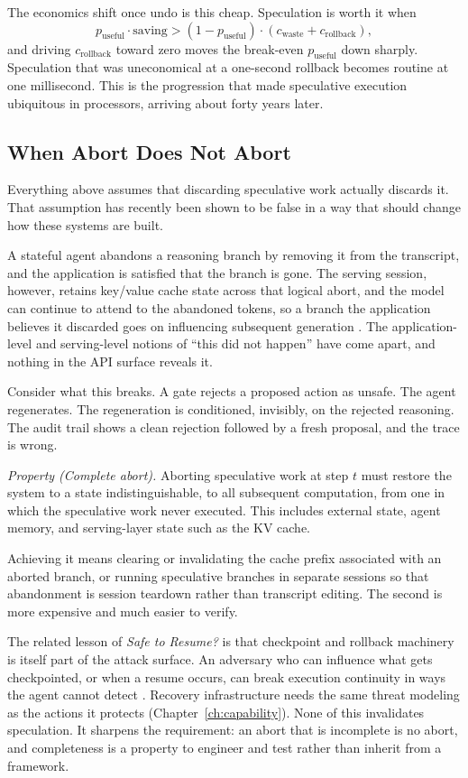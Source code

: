 \documentclass[11pt]{book}
\begin{document}
The economics shift once undo is this cheap. Speculation is worth it when
\[
p_{\text{useful}} \cdot \text{saving} > (1 - p_{\text{useful}}) \cdot (c_{\text{waste}} + c_{\text{rollback}}),
\]
and driving $c_{\text{rollback}}$ toward zero moves the break-even $p_{\text{useful}}$ down sharply. Speculation that was uneconomical at a one-second rollback becomes routine at one millisecond. This is the progression that made speculative execution ubiquitous in processors, arriving about forty years later.

\subsection{When Abort Does Not Abort}

Everything above assumes that discarding speculative work actually discards it. That assumption has recently been shown to be false in a way that should change how these systems are built.

A stateful agent abandons a reasoning branch by removing it from the transcript, and the application is satisfied that the branch is gone. The serving session, however, retains key/value cache state across that logical abort, and the model can continue to attend to the abandoned tokens, so a branch the application believes it discarded goes on influencing subsequent generation \cite{abortedkv2026}. The application-level and serving-level notions of ``this did not happen'' have come apart, and nothing in the API surface reveals it.

Consider what this breaks. A gate rejects a proposed action as unsafe. The agent regenerates. The regeneration is conditioned, invisibly, on the rejected reasoning. The audit trail shows a clean rejection followed by a fresh proposal, and the trace is wrong.

\textit{Property (Complete abort).} Aborting speculative work at step $t$ must restore the system to a state indistinguishable, to all subsequent computation, from one in which the speculative work never executed. This includes external state, agent memory, and serving-layer state such as the KV cache.

Achieving it means clearing or invalidating the cache prefix associated with an aborted branch, or running speculative branches in separate sessions so that abandonment is session teardown rather than transcript editing. The second is more expensive and much easier to verify.

The related lesson of \emph{Safe to Resume?} is that checkpoint and rollback machinery is itself part of the attack surface. An adversary who can influence what gets checkpointed, or when a resume occurs, can break execution continuity in ways the agent cannot detect \cite{saferesume2026}. Recovery infrastructure needs the same threat modeling as the actions it protects (Chapter~\ref{ch:capability}). None of this invalidates speculation. It sharpens the requirement: an abort that is incomplete is no abort, and completeness is a property to engineer and test rather than inherit from a framework.
\end{document}

